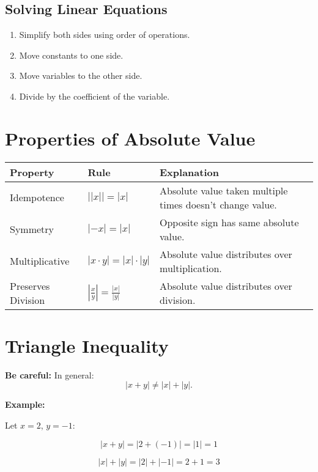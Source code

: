 \documentclass[12pt]{article}
\begin{document}
\subsection*{Solving Linear Equations}

\begin{enumerate}[label=\arabic*.]
    \item Simplify both sides using order of operations.
    \item Move constants to one side.
    \item Move variables to the other side.
    \item Divide by the coefficient of the variable.
\end{enumerate}

\section*{Properties of Absolute Value}

\begin{tabular}{|l|l|p{8cm}|}
\hline
\textbf{Property} & \textbf{Rule} & \textbf{Explanation} \\
\hline
Idempotence & $\left| \left| x \right| \right| = \left| x \right|$ & Absolute value taken multiple times doesn’t change value. \\
Symmetry & $\left| -x \right| = \left| x \right|$ & Opposite sign has same absolute value. \\
Multiplicative & $\left| x \cdot y \right| = \left| x \right| \cdot \left| y \right|$ & Absolute value distributes over multiplication. \\
Preserves Division & $\left| \frac{x}{y} \right| = \frac{\left| x \right|}{\left| y \right|}$ & Absolute value distributes over division. \\
\hline
\end{tabular}

\section*{Triangle Inequality}

\textbf{Be careful:} In general:
\[
\left| x + y \right| \neq \left| x \right| + \left| y \right|.
\]

\textbf{Example:}

Let $x = 2$, $y = -1$:

\[
\left| x + y \right| = \left| 2 + (-1) \right| = \left| 1 \right| = 1
\]

\[
\left| x \right| + \left| y \right| = \left| 2 \right| + \left| -1 \right| = 2 + 1 = 3
\]
\end{document}
